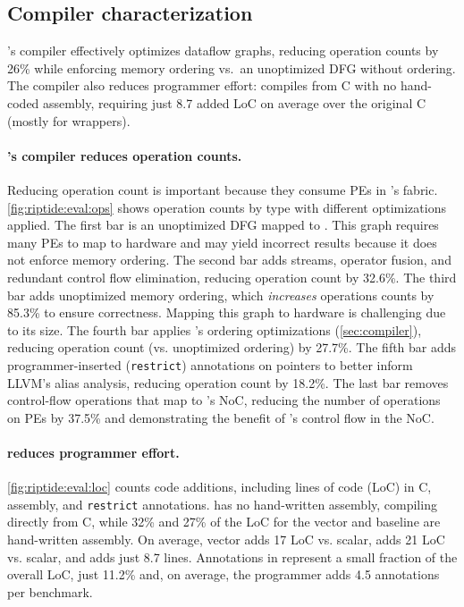 \subsection{Compiler characterization}
\riptide's compiler effectively optimizes dataflow graphs, reducing operation
counts by 26\% while enforcing memory ordering vs.\ an unoptimized DFG without
ordering.
% 
The compiler also reduces programmer effort: \riptide compiles from C with
no hand-coded assembly, requiring just 8.7 added LoC on average over the original
C (mostly for wrappers).

\paragraph{\riptide's compiler reduces operation counts.} Reducing operation count
is important because they consume PEs in \riptide's fabric.
%
\autoref{fig:riptide:eval:ops} shows operation counts by type with different optimizations applied.
% 
The first bar is an unoptimized DFG mapped to \riptide.
% 
This graph requires many PEs to map to hardware and may yield incorrect
results because it does not enforce memory ordering.
% 
The second bar adds streams, operator fusion, and redundant control flow
elimination, reducing operation count by 32.6\%.
% 
The third bar adds unoptimized memory ordering, which {\em increases} operations counts by 85.3\% to ensure correctness.
% 
Mapping this graph to hardware is challenging due to its size.
% 
The fourth bar applies \riptide's ordering optimizations (\autoref{sec:compiler}), reducing operation count (vs. unoptimized ordering) by 27.7\%.
% 
The fifth bar adds programmer-inserted ({\tt restrict}) annotations on pointers
to better inform LLVM's alias analysis, reducing operation count by 18.2\%.
% 
The last bar removes control-flow operations that map to \riptide's NoC, reducing
the number of operations on PEs by 37.5\% and demonstrating the benefit of
\riptide's control flow in the NoC.
% 

\paragraph{\riptide reduces programmer effort.}
\autoref{fig:riptide:eval:loc} counts code additions, including lines of code (LoC) in C, assembly, and {\tt restrict} annotations.  
%
\riptide has no hand-written assembly, compiling directly from C, while  32\% and
27\% of the LoC for the vector and \snafu baseline are hand-written assembly.
% 
On average, vector adds 17 LoC vs. scalar, \snafu adds 21 LoC vs. scalar, and
\riptide adds just 8.7 lines.
% 
Annotations in \riptide represent a small fraction of the overall LoC, just 11.2\%
and, on average, the programmer adds 4.5 annotations per benchmark.

